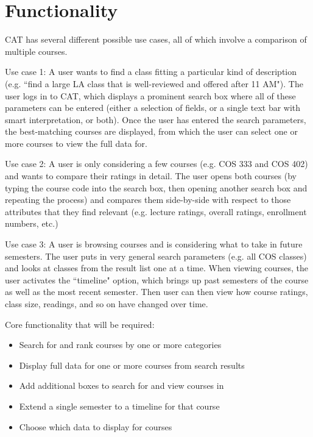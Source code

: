 \documentclass[11pt]{article}
\begin{document}
\section{Functionality}
CAT has several different possible use cases, all of which involve a comparison of multiple courses.
\par Use case 1: A user wants to find a class fitting a particular kind of description (e.g. ``find a large LA class that is well-reviewed and offered after 11 AM"). The user logs in to CAT, which displays a prominent search box where all of these parameters can be entered (either a selection of fields, or a single text bar with smart interpretation, or both). Once the user has entered the search parameters, the best-matching courses are displayed, from which the user can select one or more courses to view the full data for.
\par Use case 2: A user is only considering a few courses (e.g. COS 333 and COS 402) and wants to compare their ratings in detail. The user opens both courses (by typing the course code into the search box, then opening another search box and repeating the process) and compares them side-by-side with respect to those attributes that they find relevant (e.g. lecture ratings, overall ratings, enrollment numbers, etc.)
\par Use case 3: A user is browsing courses and is considering what to take in future semesters. The user puts in very general search parameters (e.g. all COS classes) and looks at classes from the result list one at a time. When viewing courses, the user activates the ``timeline" option, which brings up past semesters of the course as well as the most recent semester. Then user can then view how course ratings, class size, readings, and so on have changed over time.

\par Core functionality that will be required:
\begin{itemize}
\item Search for and rank courses by one or more categories
\item Display full data for one or more courses from search results
\item Add additional boxes to search for and view courses in
\item Extend a single semester to a timeline for that course
\item Choose which data to display for courses
\end{itemize}
\end{document}
